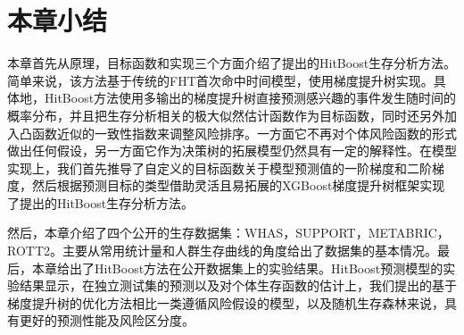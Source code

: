 \section{本章小结}

本章首先从原理，目标函数和实现三个方面介绍了提出的HitBoost生存分析方法。简单来说，该方法基于传统的FHT首次命中时间模型，使用梯度提升树实现。具体地，HitBoost方法使用多输出的梯度提升树直接预测感兴趣的事件发生随时间的概率分布，并且把生存分析相关的极大似然估计函数作为目标函数，同时还另外加入凸函数近似的一致性指数来调整风险排序。一方面它不再对个体风险函数的形式做出任何假设，另一方面它作为决策树的拓展模型仍然具有一定的解释性。在模型实现上，我们首先推导了自定义的目标函数关于模型预测值的一阶梯度和二阶梯度，然后根据预测目标的类型借助灵活且易拓展的XGBoost梯度提升树框架实现了提出的HitBoost生存分析方法。

然后，本章介绍了四个公开的生存数据集：WHAS，SUPPORT，METABRIC，ROTT2。主要从常用统计量和人群生存曲线的角度给出了数据集的基本情况。最后，本章给出了HitBoost方法在公开数据集上的实验结果。HitBoost预测模型的实验结果显示，在独立测试集的预测以及对个体生存函数的估计上，我们提出的基于梯度提升树的优化方法相比一类遵循风险假设的模型，以及随机生存森林来说，具有更好的预测性能及风险区分度。
